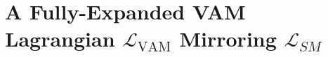 \documentclass[11pt]{article}
\begin{document}
    \section*{A Fully-Expanded VAM Lagrangian \(\mathcal{L}_\text{VAM}\) Mirroring \(\mathcal{L}_{SM}\)}

    \newcommand{\Ce}{C_e}
    \newcommand{\rhof}{\rho_\text{\ae}^{(\text{fluid})}}
    \newcommand{\rhom}{\rho_\text{\ae}^{(\text{mass})}}
    \newcommand{\rhoe}{\rho_\text{\ae}^{(\text{energy})}}

    \newcommand{\alphaEM}{\alpha}       %
    \newcommand{\phiG}{\varphi}         %

    \newcommand{\rc}{r_c}               %
    \newcommand{\tp}{t_p}               %
    \newcommand{\Fmax}{F_{\text{max}}}  %
    \newcommand{\CeC}{C_e}              %
    \newcommand{\Ck}{C_\kappa}          %
    \newcommand{\Cg}{C_g}               %

    \newcommand{\Gsw}{G_\text{swirl}}
    \newcommand{\cspeed}{c}
\end{document}
